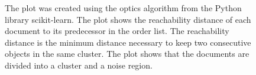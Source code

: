 \begin{figure}%
    \centering
    \qquad
    \caption{The plot was created using the \ac{optics} algorithm from the Python library scikit-learn.
    The plot shows the reachability distance of each document to its predecessor in the order list.
    The reachability distance is the minimum distance necessary to keep two consecutive objects in the same cluster.
    The plot shows that the documents are divided into a cluster and a noise region.}%
    \label{fig:reachability_plots}%
\end{figure}


